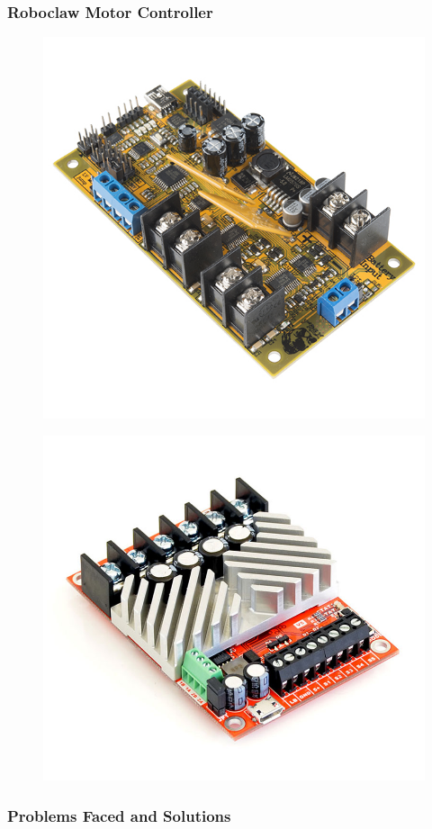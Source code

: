 \subsubsection*{Roboclaw Motor Controller}

\begin{figure}
    \centering
    \begin{minipage}{.5\textwidth}
        \centering
        \includegraphics[width=\linewidth]{figures/trex.jpg}
        \label{fig:test1}
    \end{minipage}%
    \begin{minipage}{.5\textwidth}
        \centering
        \includegraphics[width=\linewidth]{figures/roboclaw.jpg}
        \label{fig:test1}
    \end{minipage}
\end{figure}



\subsubsection*{Problems Faced and Solutions}